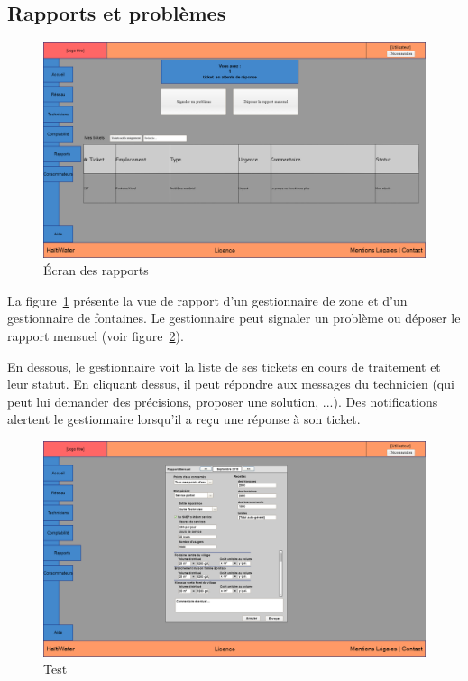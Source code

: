 \documentclass[a4paper, 11pt]{article}
\begin{document}
  \subsection{Rapports et problèmes}
    \begin{figure}[H]
        \includegraphics[width=\textwidth]{Cahier_des_Charges/rapports}
        \caption{\'Ecran des rapports}
        \label{fig:report}
    \end{figure}
    La figure~\ref{fig:report} présente la vue de rapport d'un gestionnaire de zone et d'un gestionnaire de fontaines. Le gestionnaire peut signaler un problème ou déposer le rapport mensuel (voir figure~\ref{fig:monthly_report}).

    En dessous, le gestionnaire voit la liste de ses tickets en cours de traitement et leur statut. En cliquant dessus, il peut répondre aux messages du technicien (qui peut lui demander des précisions, proposer une solution, ...). Des notifications alertent le gestionnaire lorsqu'il a reçu une réponse à son ticket.

    \begin{figure}[H]
        \includegraphics[width=\textwidth]{Cahier_des_Charges/rapports_mensuel}
        \caption{Test}
        \label{fig:monthly_report}
    \end{figure}
\end{document}

